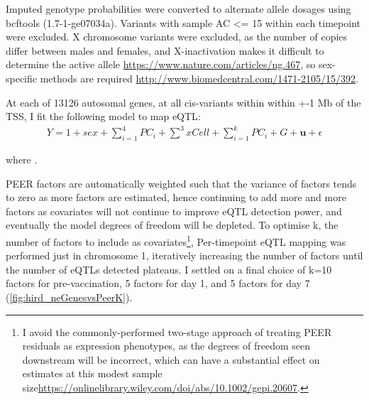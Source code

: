 Imputed genotype probabilities were converted to alternate allele dosages using bcftools (1.7-1-ge07034a).
Variants with sample \gls{AC} <= 15 within each timepoint were excluded.
X chromosome variants were excluded, as the number of copies differ between males and females, and X-inactivation makes it difficult to determine the active allele \url{https://www.nature.com/articles/ng.467},
so sex-specific methods are required \url{http://www.biomedcentral.com/1471-2105/15/392}.

At each of 13126 autosomal genes, at all cis-variants within within +-1 Mb of the \gls{TSS}, I fit the following model to map \gls{eQTL}:
\begin{equation}
\begin{split}
Y = 1 + sex + \sum_{i=1}^{4}{PC_i} + \sum_{}^{3}{xCell} + \sum_{i=1}^{k}{PC_i} + G + \mathbf{u} + \epsilon
\end{split}
\end{equation}

where \todo{}.

PEER factors are automatically weighted such that the variance of factors tends to zero as more factors are estimated, 
hence continuing to add more and more factors as covariates will not continue to improve \gls{eQTL} detection power, and eventually the model degrees of freedom will be depleted.
To optimise k, the number of factors to include as covariates\footnote{I avoid the commonly-performed two-stage approach of treating PEER residuals as expression phenotypes, as the degrees of freedom seen downstream will be incorrect, which can have a substantial effect on estimates at this modest sample size\url{https://onlinelibrary.wiley.com/doi/abs/10.1002/gepi.20607}.}, 
Per-timepoint \gls{eQTL} mapping was performed just in chromosome 1, iteratively increasing the number of factors until the number of \glspl{eQTL} detected plateaus.
I settled on a final choice of k=10 factors for pre-vaccination, 5 factors for day 1, and 5 factors for day 7 (\autoref{fig:hird_neGenesvsPeerK}).

